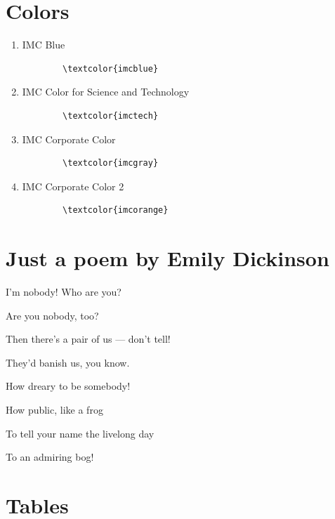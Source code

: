 \documentclass{imc-inf}
\begin{document}
\section{Colors}
\begin{enumerate}
\item \textcolor{imcblue}{IMC Blue}  
    \begin{verbatim}
        \textcolor{imcblue}
    \end{verbatim}
\item \textcolor{imctech}{IMC Color for Science and Technology}
    \begin{verbatim}
        \textcolor{imctech}
    \end{verbatim}
\item \textcolor{imcgray}{IMC Corporate Color}
\begin{verbatim}
        \textcolor{imcgray}
    \end{verbatim}
\item \textcolor{imcorange}{IMC Corporate Color 2}
\begin{verbatim}
        \textcolor{imcorange}
    \end{verbatim}
\end{enumerate}

\section {Just a poem by Emily Dickinson}

I'm nobody! Who are you?

Are you nobody, too?

Then there's a pair of us — don't tell!

They'd banish us, you know.

How dreary to be somebody!

How public, like a frog

To tell your name the livelong day

To an admiring bog!
	
\section{Tables}
\end{document}
